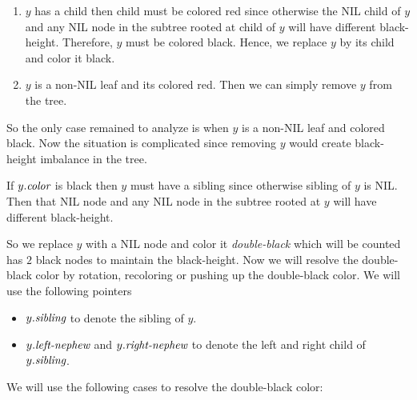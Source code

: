 \begin{enumerate}
	\item $y$ has a child then child must be colored red since otherwise the NIL child of $y$ and any NIL node in the subtree rooted at child of $y$ will have different black-height. Therefore, $y$ must be colored black. Hence, we replace $y$ by its child and color it black.
	\item $y$ is a non-NIL leaf and its colored red. Then we can simply remove $y$ from the tree.
\end{enumerate}
So the only case remained to analyze is when $y$ is a non-NIL leaf and colored black. Now the situation is complicated since removing $y$ would create black-height imbalance in the tree.
\begin{observation}
	If $y.\emph{color}$ is black then $y$ must have a sibling since otherwise sibling of $y$ is NIL. Then that NIL node and any NIL node in the subtree rooted at $y$ will have different black-height.
\end{observation}
So we replace $y$ with a NIL node and color it \emph{double-black} which  will be counted has $2$ black nodes to maintain the black-height. Now we will resolve the double-black color by rotation, recoloring or pushing up the double-black color. We will use the following pointers \begin{itemize}
	\item $y.\emph{sibling}$ to denote the sibling of $y$.
	\item $y.\emph{left-nephew}$ and  $y.\emph{right-nephew}$ to denote the left and right child of $y.\emph{sibling}$.
\end{itemize} We will use the following cases to resolve the double-black color:

